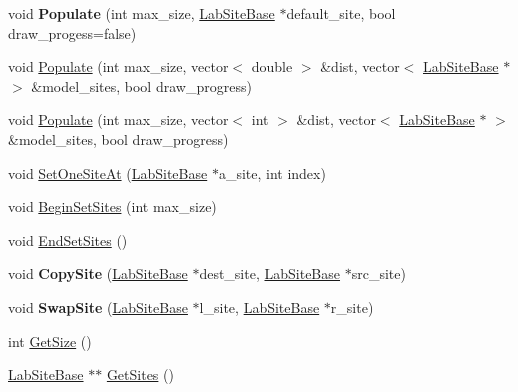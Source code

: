 \begin{DoxyCompactItemize}
\item 
\hypertarget{classelps_1_1_lab_array_binding_a0c6266ff3d309f3f06443c5a7b765e75}{void {\bfseries Populate} (int max\+\_\+size, \hyperlink{classelps_1_1_lab_site_base}{Lab\+Site\+Base} $\ast$default\+\_\+site, bool draw\+\_\+progess=false)}\label{classelps_1_1_lab_array_binding_a0c6266ff3d309f3f06443c5a7b765e75}

\item 
void \hyperlink{classelps_1_1_lab_array_binding_a0bfea7ab183f2eaea55f7d263fb989fc}{Populate} (int max\+\_\+size, vector$<$ double $>$ \&dist, vector$<$ \hyperlink{classelps_1_1_lab_site_base}{Lab\+Site\+Base} $\ast$ $>$ \&model\+\_\+sites, bool draw\+\_\+progress)
\item 
void \hyperlink{classelps_1_1_lab_array_binding_a21225cf34962f85deaa4cab7820ba0c7}{Populate} (int max\+\_\+size, vector$<$ int $>$ \&dist, vector$<$ \hyperlink{classelps_1_1_lab_site_base}{Lab\+Site\+Base} $\ast$ $>$ \&model\+\_\+sites, bool draw\+\_\+progress)
\item 
void \hyperlink{classelps_1_1_lab_array_binding_a013b69215421c107efac95ce721f75ad}{Set\+One\+Site\+At} (\hyperlink{classelps_1_1_lab_site_base}{Lab\+Site\+Base} $\ast$a\+\_\+site, int index)
\item 
void \hyperlink{classelps_1_1_lab_array_binding_a49ed4974aedf9bf56bde074d54d53e2e}{Begin\+Set\+Sites} (int max\+\_\+size)
\item 
void \hyperlink{classelps_1_1_lab_array_binding_ac31dc1780cf4983f43a6c8788f4ee093}{End\+Set\+Sites} ()
\item 
\hypertarget{classelps_1_1_lab_array_binding_a9f916c1cc4634ca4afa0ab6e153a90ea}{void {\bfseries Copy\+Site} (\hyperlink{classelps_1_1_lab_site_base}{Lab\+Site\+Base} $\ast$dest\+\_\+site, \hyperlink{classelps_1_1_lab_site_base}{Lab\+Site\+Base} $\ast$src\+\_\+site)}\label{classelps_1_1_lab_array_binding_a9f916c1cc4634ca4afa0ab6e153a90ea}

\item 
\hypertarget{classelps_1_1_lab_array_binding_a2a22ab5ca8b38cb9546cfb892dab9357}{void {\bfseries Swap\+Site} (\hyperlink{classelps_1_1_lab_site_base}{Lab\+Site\+Base} $\ast$l\+\_\+site, \hyperlink{classelps_1_1_lab_site_base}{Lab\+Site\+Base} $\ast$r\+\_\+site)}\label{classelps_1_1_lab_array_binding_a2a22ab5ca8b38cb9546cfb892dab9357}

\item 
int \hyperlink{classelps_1_1_lab_array_binding_a777544a96ee2281566a5f2a88504a64c}{Get\+Size} ()
\item 
\hyperlink{classelps_1_1_lab_site_base}{Lab\+Site\+Base} $\ast$$\ast$ \hyperlink{classelps_1_1_lab_array_binding_acd1fe8c7abfbd2a5d9855266e556ea8f}{Get\+Sites} ()
\end{DoxyCompactItemize}


